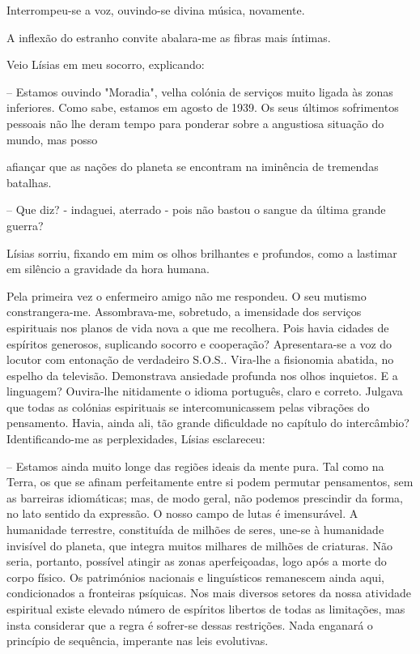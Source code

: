 \documentclass[portuguese,12pt,a4paper]{scrbook}
\begin{document}
	Interrompeu-se a voz, ouvindo-se divina música, novamente.
	
	A inflexão do estranho convite abalara-me as fibras mais íntimas.
	
	Veio Lísias em meu socorro, explicando:
	
	– Estamos ouvindo "Moradia", velha colónia de serviços muito ligada às zonas inferiores. Como sabe, estamos em agosto de 1939. Os seus últimos sofrimentos pessoais não lhe deram tempo para ponderar sobre a angustiosa situação do mundo, mas posso
	
	
	afiançar que as nações do planeta se encontram na iminência de tremendas batalhas.
	
	– Que diz? - indaguei, aterrado - pois não bastou o sangue da última grande guerra?
	
	Lísias sorriu, fixando em mim os olhos brilhantes e profundos, como a lastimar em silêncio a gravidade da hora humana.
	
	Pela primeira vez o enfermeiro amigo não me respondeu. O seu mutismo constrangera-me. Assombrava-me, sobretudo, a imensidade dos serviços espirituais nos planos de vida nova a que me recolhera. Pois havia cidades de espíritos generosos, suplicando socorro e cooperação? Apresentara-se a voz do locutor com entonação de verdadeiro S.O.S.. Vira-lhe a fisionomia abatida, no espelho da televisão. Demonstrava ansiedade profunda nos olhos inquietos. E a linguagem? Ouvira-lhe nitidamente o idioma português, claro e correto. Julgava que todas as colónias espirituais se intercomunicassem pelas vibrações do pensamento. Havia, ainda ali, tão grande dificuldade no capítulo do intercâmbio? Identificando-me as perplexidades, Lísias esclareceu:
	
	– Estamos ainda muito longe das regiões ideais da mente pura. Tal como na Terra, os que se afinam perfeitamente entre si podem permutar pensamentos, sem as barreiras idiomáticas; mas, de modo geral, não podemos prescindir da forma, no lato sentido da expressão. O nosso campo de lutas é imensurável. A humanidade terrestre, constituída de milhões de seres, une-se à humanidade invisível do planeta, que integra muitos milhares de milhões de criaturas. Não seria, portanto, possível atingir as zonas aperfeiçoadas, logo após a morte do corpo físico. Os patrimónios nacionais e linguísticos remanescem ainda aqui, condicionados a fronteiras psíquicas. Nos mais diversos setores da nossa atividade espiritual existe elevado número de espíritos libertos de todas as limitações, mas insta considerar que a regra é sofrer-se dessas restrições. Nada enganará o princípio de sequência, imperante nas leis evolutivas.
	
\end{document}
